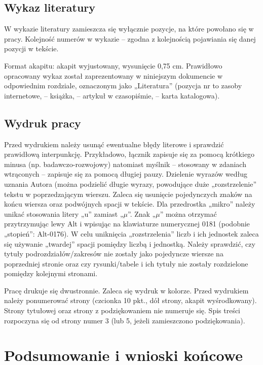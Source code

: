 \documentclass[12pt]{article}
\begin{document}
\subsection{Wykaz literatury}

W wykazie literatury zamieszcza się wyłącznie pozycje, na które powołano się
w pracy. Kolejność numerów w wykazie – zgodna z kolejnością pojawiania się danej
pozycji w tekście.

Format akapitu: akapit wyjustowany, wysunięcie 0,75 cm. Prawidłowo opracowany
wykaz został zaprezentowany w niniejszym dokumencie w odpowiednim rozdziale, oznaczonym jako „Literatura”  (pozycja nr \cite{str} to zasoby internetowe,
\cite{Jakubczyk1997} – książka, \cite{Barski2011} – artykuł w czasopiśmie, \cite{dokum} – karta katalogowa).

	{\subsection{Wydruk pracy}}

Przed wydrukiem należy usunąć ewentualne błędy literowe i sprawdzić prawidłową
interpunkcję. Przykładowo, łącznik zapisuje się za pomocą krótkiego minusa (np.
badawczo-rozwojowy) natomiast myślnik -- stosowany w zdaniach wtrąconych -- zapisuje
się za pomocą długiej pauzy. Dzielenie wyrazów według uznania Autora (można podzielić
długie wyrazy, powodujące duże „rozstrzelenie” tekstu w poprzedzającym wierszu. Zaleca się usunięcie pojedynczych znaków na końcu wiersza oraz podwójnych spacji w tekście.
Dla przedrostka „mikro” należy unikać stosowania litery „u” zamiast „$\mu$”. Znak „$\mu$” można
otrzymać przytrzymując lewy Alt i wpisując na klawiaturze numerycznej 0181 (podobnie
„stopień”: Alt-0176). W celu uniknięcia „rozstrzelenia” liczb i ich jednostek zaleca się
używanie „twardej” spacji pomiędzy liczbą i jednostką. Należy sprawdzić, czy tytuły
podrozdziałów/zakresów nie zostały jako pojedyncze wiersze na poprzedniej stronie oraz
czy rysunki/tabele i ich tytuły nie zostały rozdzielone pomiędzy kolejnymi stronami.

Pracę drukuje się dwustronnie. Zaleca się wydruk w kolorze. Przed wydrukiem
należy ponumerować strony (czcionka 10 pkt., dół strony, akapit wyśrodkowany). Strony
tytułowej oraz strony z podziękowaniem nie numeruje się. Spis treści rozpoczyna się od
strony numer 3 (lub 5, jeżeli zamieszczono podziękowania).

\clearpage

\section{Podsumowanie i wnioski końcowe}
\end{document}
